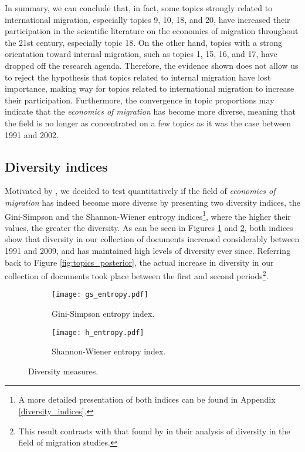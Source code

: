 In summary, we can conclude that, in fact, some topics strongly related to international migration, especially topics 9, 10, 18, and 20, have increased their participation in the scientific literature on the economics of migration throughout the 21st century, especially topic 18. On the other hand, topics with a strong orientation toward internal migration, such as topics 1, 15, 16, and 17, have dropped off the research agenda. Therefore, the evidence shown does not allow us to reject the hypothesis that topics related to internal migration have lost importance, making way for topics related to international migration to increase their participation. Furthermore, the convergence in topic proportions may indicate that the \textit{economics of migration} has become more diverse, meaning that the field is no longer as concentrated on a few topics as it was the case between 1991 and 2002. 

\subsection{Diversity indices} \label{results_diversity_indices}

Motivated by \cite{pisarevskaya_mapping_2020}, we decided to test quantitatively if the field of \textit{economics of migration} has indeed become more diverse by presenting two diversity indices, the Gini-Simpson and the Shannon-Wiener entropy indices\footnote{A more detailed presentation of both indices can be found in Appendix \ref{diversity_indices}.}, where the higher their values, the greater the diversity. As can be seen in Figures \ref{fig:gini_simpson_entropy} and \ref{fig:shannon_wiener_entropy}, both indices show that diversity in our collection of documents increased considerably between 1991 and 2009, and has maintained high levels of diversity ever since. Referring back to Figure \ref{fig:topics_posterior}, the actual increase in diversity in our collection of documents took place between the first and second periods\footnote{This result contrasts with that found by \cite[p. 467]{pisarevskaya_mapping_2020} in their analysis of diversity in the field of migration studies.}.

\begin{figure}[ht!]
	\centering
	\begin{subfigure}{0.49\textwidth}
		\centering
		\texttt{[image: gs\_entropy.pdf]}
		\caption{Gini-Simpson entropy index.}
		\label{fig:gini_simpson_entropy}
	\end{subfigure}
	\hfill
	\begin{subfigure}{0.49\textwidth}
		\centering
		\texttt{[image: h\_entropy.pdf]}
		\caption{Shannon-Wiener entropy index.}
		\label{fig:shannon_wiener_entropy}
	\end{subfigure}
\caption{Diversity measures.}
\label{fig:diversity_indices}
\end{figure}